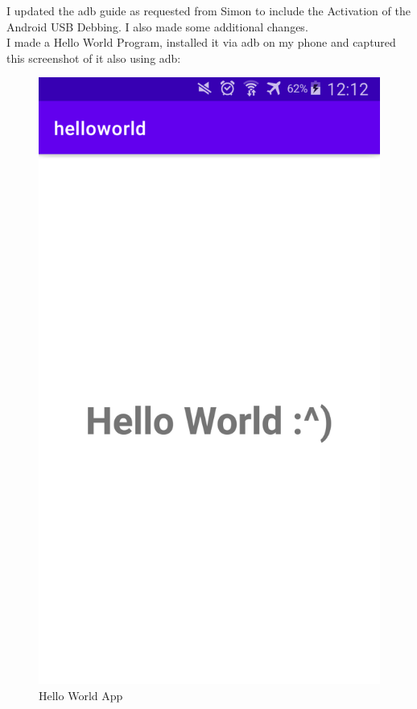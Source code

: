 I updated the adb guide as requested from Simon to include the Activation of the Android USB Debbing. I also made some additional changes.\\

I made a Hello World Program, installed it via adb on my phone and captured this screenshot of it also using adb:\\

\begin{figure}[H]
\centering
\includegraphics[width=.4\textwidth]{media/hello-world-app-noah-screenshot}
\caption{Hello World App}
\end{figure}
